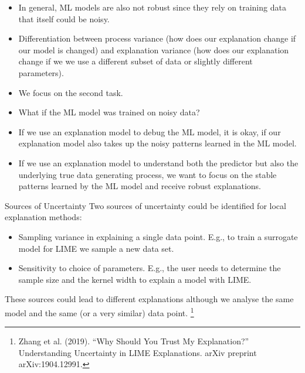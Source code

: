 \documentclass[11pt,compress,t,notes=noshow, xcolor=table]{beamer}
\begin{document}
\begin{vbframe}
	\begin{itemize}
		\item In general, ML models are also not robust since they rely on training data that itself could be noisy. 
		\item Differentiation between process variance (how does our explanation change if our model is changed) and explanation variance (how does our explanation change if we we use a different subset of data or slightly different parameters).
		\item We focus on the second task.  
		\item What if the ML model was trained on noisy data? 
		\item If we use an explanation model to debug the ML model, it is okay, if our explanation model also takes up the noisy patterns learned in the ML model. 
		\item If we use an explanation model to understand both the predictor but also the underlying true data generating process, we want to focus on the stable patterns learned by the ML model and receive robust explanations. 
	\end{itemize}
\end{vbframe}

\begin{vbframe}{Sources of Uncertainty}
	Two sources of uncertainty could be identified for local explanation methods: 
	\begin{itemize}
		\item Sampling variance in explaining a single data point. 
		E.g., to train a surrogate model for LIME we sample a new data set.   
		\item Sensitivity to choice of parameters. E.g., the user needs to determine the sample size and the kernel width to explain a model with LIME. 
	\end{itemize}
These sources could lead to different explanations although we analyse the same model and the same (or a very similar) data point. 
\footnote[frame]{Zhang et al. (2019). ``Why Should You Trust My Explanation?'' Understanding Uncertainty in LIME Explanations. arXiv preprint arXiv:1904.12991.} 
\end{vbframe}
\end{document}
